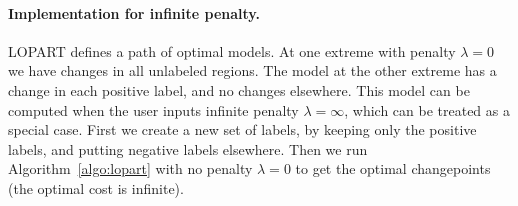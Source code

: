 \documentclass[12pt]{article}
\begin{document}
\paragraph{Implementation for infinite penalty.} LOPART defines a path of optimal models. At one extreme with penalty $\lambda=0$ we have changes in all unlabeled regions. The model at the other extreme has a change in each positive label, and no changes elsewhere. 
This model can be computed when the user inputs infinite penalty $\lambda=\infty$, which can be treated as a special case. First we create a new set of labels, by keeping only the positive labels, and putting negative labels elsewhere. Then we run Algorithm~\ref{algo:lopart} with no penalty $\lambda=0$ to get the optimal changepoints (the optimal cost is infinite). 


\end{document}
